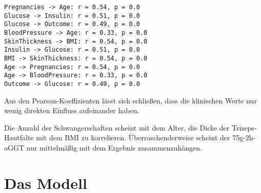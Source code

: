\documentclass[11.5pt]{article}
\begin{document}
    \begin{Verbatim}[commandchars=\\\{\}]
Pregnancies -> Age: r = 0.54, p = 0.0
Glucose -> Insulin: r = 0.51, p = 0.0
Glucose -> Outcome: r = 0.49, p = 0.0
BloodPressure -> Age: r = 0.33, p = 0.0
SkinThickness -> BMI: r = 0.54, p = 0.0
Insulin -> Glucose: r = 0.51, p = 0.0
BMI -> SkinThickness: r = 0.54, p = 0.0
Age -> Pregnancies: r = 0.54, p = 0.0
Age -> BloodPressure: r = 0.33, p = 0.0
Outcome -> Glucose: r = 0.49, p = 0.0
    \end{Verbatim}

    Aus den Pearson-Koeffizienten lässt sich schließen, dass die klinischen
Werte nur wenig direkten Einfluss aufeinander haben.

Die Anzahl der Schwangerschaften scheint mit dem Alter, die Dicke der
Trizeps-Hautfalte mit dem BMI zu korrelieren. Überraschenderweise
scheint der 75g-2h-oGGT nur mittelmäßig mit dem Ergebnis
zusammenzuhängen.

    \hypertarget{das-modell}{%
\section{Das Modell}\label{das-modell}}
\end{document}
